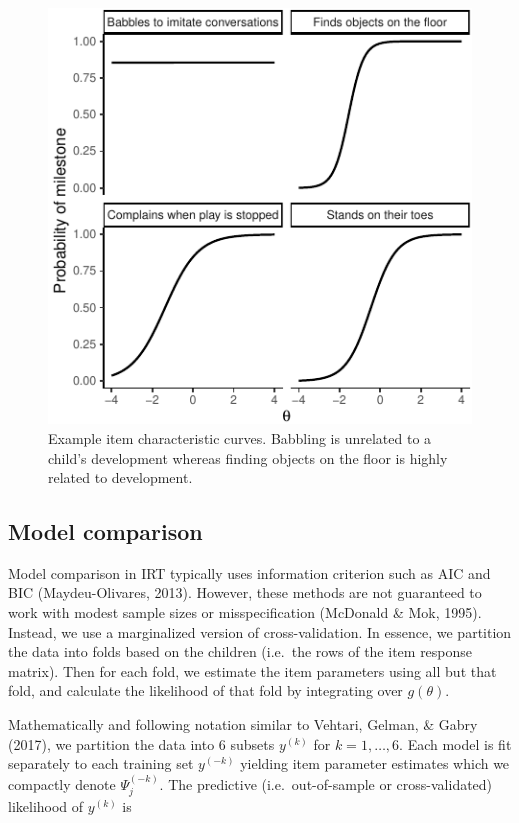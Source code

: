 \documentclass[10pt, letterpaper]{article}
\newenvironment{CodeChunk}{}{}
\begin{document}
\begin{CodeChunk}
\begin{figure}[tb]
\includegraphics{figs/icc-1} \caption[Example item characteristic curves]{Example item characteristic curves. Babbling is unrelated to a child's development whereas finding objects on the floor is highly related to development.}\label{fig:icc}
\end{figure}
\end{CodeChunk}

\hypertarget{modelcompare}{%
\subsection{Model comparison}\label{modelcompare}}

Model comparison in IRT typically uses information criterion such as AIC
and BIC (Maydeu-Olivares, 2013). However, these methods are not
guaranteed to work with modest sample sizes or misspecification
(McDonald \& Mok, 1995). Instead, we use a marginalized version of
cross-validation. In essence, we partition the data into folds based on
the children (i.e.~the rows of the item response matrix). Then for each
fold, we estimate the item parameters using all but that fold, and
calculate the likelihood of that fold by integrating over \(g(\theta)\).

Mathematically and following notation similar to Vehtari, Gelman, \&
Gabry (2017), we partition the data into 6 subsets \(y^{(k)}\) for
\(k = 1, \dots, 6\). Each model is fit separately to each training set
\(y^{(-k)}\) yielding item parameter estimates which we compactly denote
\(\Psi_j^{(-k)}\). The predictive (i.e.~out-of-sample or
cross-validated) likelihood of \(y^{(k)}\) is
\end{document}
